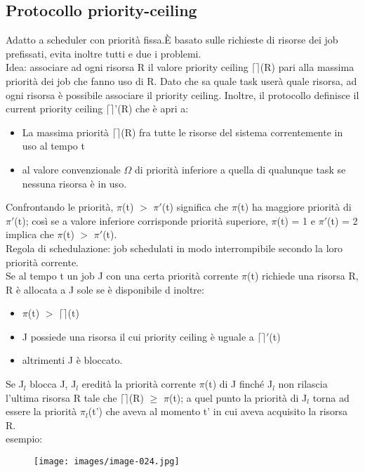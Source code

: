 \documentclass[12pt, oneside]{extbook}
\begin{document}
\subsection{Protocollo priority-ceiling}
Adatto a scheduler con priorità fissa.È basato sulle richieste di risorse dei job prefissati, evita inoltre tutti e due i problemi.\\ Idea: associare ad ogni risorsa R il valore priority ceiling $\lceil\rceil$(R) pari alla massima priorità dei job che fanno uso di R. Dato che sa quale task userà quale risorsa, ad ogni risorsa è possibile associare il priority ceiling. Inoltre, il protocollo definisce il current priority ceiling $\lceil\rceil$'(R) che è apri a:
\begin{itemize}
\item La massima priorità $\lceil\rceil$(R) fra tutte le risorse del sistema correntemente in uso al tempo t
\item al valore convenzionale $\Omega$ di priorità  inferiore a quella di qualunque task se nessuna risorsa è in uso.
\end{itemize}
Confrontando le priorità, $\pi$(t) $>$ $\pi'$(t) significa che $\pi$(t) ha maggiore priorità di $\pi'$(t); così se a valore inferiore corrisponde priorità superiore, $\pi$(t) = 1 e $\pi'$(t) = 2 implica che $\pi$(t) $>$ $\pi'$(t).\\ Regola di schedulazione: job schedulati in modo interrompibile secondo la loro priorità corrente.\\ Se al tempo t un job J con una certa priorità corrente $\pi$(t) richiede una risorsa R, R è allocata a J sole se è disponibile d inoltre:
\begin{itemize}
\item $\pi$(t) $>$ $\lceil\rceil$(t)
\item J possiede una risorsa il cui priority ceiling è uguale a $\lceil\rceil'$(t)
\item altrimenti J è bloccato.
\end{itemize}
Se J$_{l}$ blocca J, J$_{l}$ eredità la priorità corrente $\pi$(t) di J finché J$_{l}$ non rilascia l'ultima risorsa R tale che $\lceil\rceil$(R) $\geq$ $\pi$(t); a quel punto la priorità di J$_{l}$ torna ad essere la priorità $\pi_{l}$(t') che aveva al momento t' in cui aveva acquisito la risorsa R.\\ esempio:\\
\begin{figure}[!h]
\centering
\texttt{[image: images/image-024.jpg]}
\end{figure}
\end{document}

